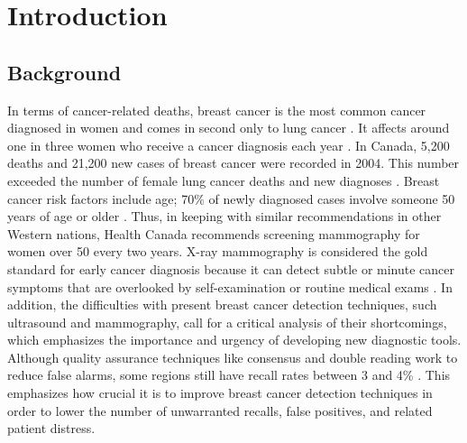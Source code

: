 \chapter{Introduction}
\label{chap1}
\section{Background}
In terms of cancer-related deaths, breast cancer is the most common cancer diagnosed in women and comes in second only to lung cancer \cite{CanadianCancer2004}. It affects around one in three women who receive a cancer diagnosis each year \cite{CancerJournal}. In Canada, 5,200 deaths and 21,200 new cases of breast cancer were recorded in 2004. This number exceeded the number of female lung cancer deaths and new diagnoses \cite{Michael2006}. 
\newline Breast cancer risk factors include age; 70\% of newly diagnosed cases involve someone 50 years of age or older \cite{CanadianCancer2004}. Thus, in keeping with similar recommendations in other Western nations, Health Canada recommends screening mammography for women over 50 every two years. X-ray mammography is considered the gold standard for early cancer diagnosis because it can detect subtle or minute cancer symptoms that are overlooked by self-examination or routine medical exams \cite{CanadianCancer2004}.
\newline In addition, the difficulties with present breast cancer detection techniques, such ultrasound and mammography, call for a critical analysis of their shortcomings, which emphasizes the importance and urgency of developing new diagnostic tools. Although quality assurance techniques like consensus and double reading work to reduce false alarms, some regions still have recall rates between 3 and 4\% \cite{QualityMeasure}. This emphasizes how crucial it is to improve breast cancer detection techniques in order to lower the number of unwarranted recalls, false positives, and related patient distress.
